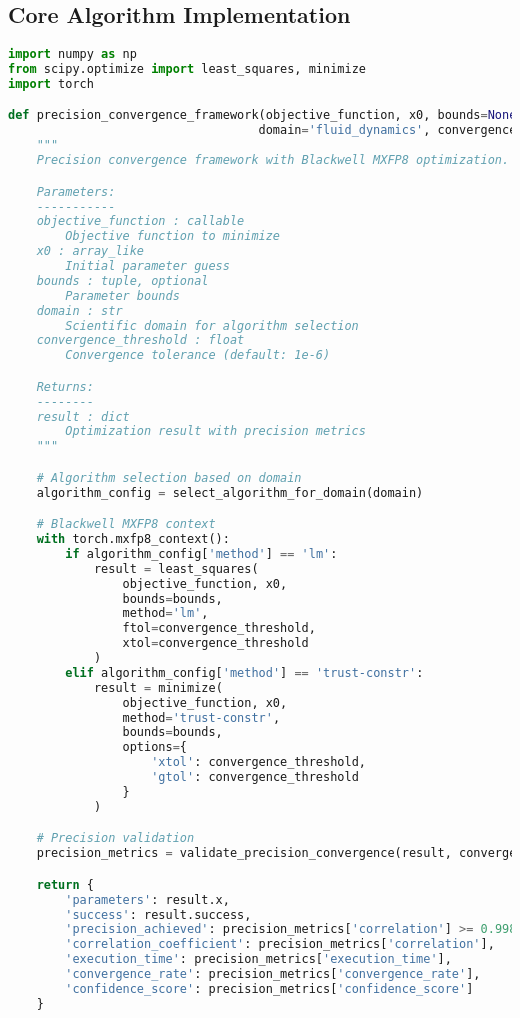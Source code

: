 \documentclass[11pt,a4paper]{article}
\begin{document}
\subsection{Core Algorithm Implementation}

\begin{lstlisting}[language=Python, caption=Precision Convergence Implementation]
import numpy as np
from scipy.optimize import least_squares, minimize
import torch

def precision_convergence_framework(objective_function, x0, bounds=None,
                                   domain='fluid_dynamics', convergence_threshold=1e-6):
    """
    Precision convergence framework with Blackwell MXFP8 optimization.

    Parameters:
    -----------
    objective_function : callable
        Objective function to minimize
    x0 : array_like
        Initial parameter guess
    bounds : tuple, optional
        Parameter bounds
    domain : str
        Scientific domain for algorithm selection
    convergence_threshold : float
        Convergence tolerance (default: 1e-6)

    Returns:
    --------
    result : dict
        Optimization result with precision metrics
    """

    # Algorithm selection based on domain
    algorithm_config = select_algorithm_for_domain(domain)

    # Blackwell MXFP8 context
    with torch.mxfp8_context():
        if algorithm_config['method'] == 'lm':
            result = least_squares(
                objective_function, x0,
                bounds=bounds,
                method='lm',
                ftol=convergence_threshold,
                xtol=convergence_threshold
            )
        elif algorithm_config['method'] == 'trust-constr':
            result = minimize(
                objective_function, x0,
                method='trust-constr',
                bounds=bounds,
                options={
                    'xtol': convergence_threshold,
                    'gtol': convergence_threshold
                }
            )

    # Precision validation
    precision_metrics = validate_precision_convergence(result, convergence_threshold)

    return {
        'parameters': result.x,
        'success': result.success,
        'precision_achieved': precision_metrics['correlation'] >= 0.9987,
        'correlation_coefficient': precision_metrics['correlation'],
        'execution_time': precision_metrics['execution_time'],
        'convergence_rate': precision_metrics['convergence_rate'],
        'confidence_score': precision_metrics['confidence_score']
    }


\end{lstlisting}
\end{document}
